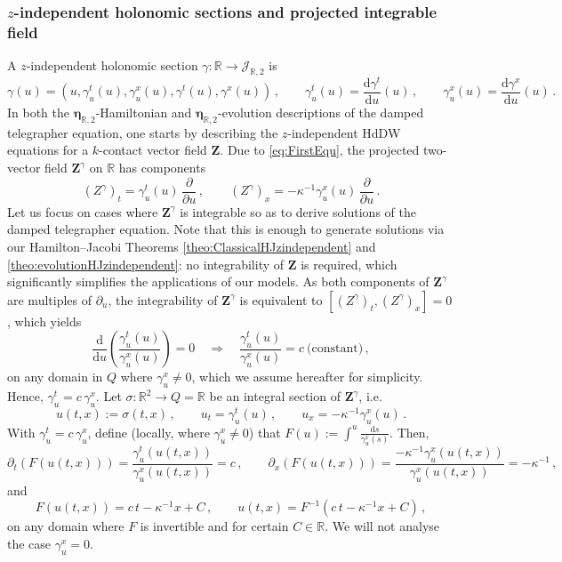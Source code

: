 \documentclass[11pt,twoside]{article}
\theoremstyle{plain}
\theoremstyle{definition}
\theoremstyle{remark}
\renewcommand{\d}{\mathrm{d}}
\begin{document}
\subsubsection{\texorpdfstring{$z$}{z}-independent holonomic sections and projected integrable field}


A $z$-independent holonomic section $\gamma\colon \mathbb{R}\rightarrow \mathcal{J}_{\mathbb{R},2}$ is
\[
\gamma(u)=(u,\gamma_u^t(u),\gamma_u^x(u),\gamma^t(u),\gamma^x(u))\,,
\qquad
\gamma_u^t(u)=\frac{\d\gamma^t}{\d u}(u)\,,\qquad \gamma_u^x(u)=\frac{\d\gamma^x}{\d u}(u)\,.
\]
In both the   ${\bm \eta}_{\mathbb{R},2}$-Hamiltonian and ${\bm \eta}_{\mathbb{R},2}$-evolution descriptions of the damped telegrapher equation, one starts by describing the $z$-independent HdDW equations for a $k$-contact vector field ${\bm Z}$. Due to \eqref{eq:FirstEqu},
the projected two-vector field ${\bm Z}^\gamma$ on $\mathbb{R}$ has components 
\[
(Z^\gamma)_t=\gamma_u^t(u)\,\frac{\partial}{\partial u}\,,
\qquad
(Z^\gamma)_x=-\kappa^{-1}\gamma_u^x(u)\,\frac{\partial}{\partial u}\,.
\]
Let us focus on cases where ${\bm Z}^\gamma$ is integrable so as to derive solutions of  the damped telegrapher equation. Note that this is enough to generate solutions via our Hamilton--Jacobi Theorems \ref{theo:ClassicalHJzindependent} and \ref{theo:evolutionHJzindependent}: no integrability of ${\bm Z}$ is required, which significantly simplifies the applications of our models. As both components of ${\bm Z}^\gamma$ are multiples of $\partial_u$,
the integrability of ${\bm Z}^\gamma$ is equivalent to $[(Z^\gamma)_t,(Z^\gamma)_x]=0$, which yields
\[
\frac{\d}{\d u}\left(\frac{\gamma_u^t(u)}{\gamma_u^x(u)}\right)=0
\quad\Longrightarrow\quad
\frac{\gamma_u^t(u)}{\gamma_u^x(u)}=c\ \text{(constant)}\,,
\]
on any domain in $Q$ where $\gamma_u^x\neq 0$, which we assume hereafter for simplicity. Hence, $\gamma_u^t=c\,\gamma_u^x$. Let $\sigma\colon\mathbb R^2\to Q=\mathbb R$ be an integral section of ${\bm Z}^\gamma$, i.e.
\[
    u(t,x):=\sigma(t,x)\,,\qquad
    u_t=\gamma_u^t(u)\,,\qquad u_x=-\kappa^{-1}\gamma_u^x(u)\,.
\]
With $\gamma_u^t=c\,\gamma_u^x$, define (locally, where $\gamma_u^x\neq0$) that 
\(F(u):=\int^u\frac{\d s}{\gamma_u^x(s)}\).
Then,
\[
\partial_t(F(u(t,x)))=\frac{\gamma_u^t(u(t,x))}{\gamma_u^x(u(t,x))}=c\,,\qquad 
\partial_x(F(u(t,x)))=\frac{-\kappa^{-1}\gamma_u^x(u(t,x))}{\gamma_u^x(u(t,x))}=-\kappa^{-1}\,,
\]
and 
\begin{equation}\label{eq:projected_solution_general}
    F(u(t,x))=c\,t-\kappa^{-1}x+C\,,
    \qquad
    u(t,x)=F^{-1}(c\,t-\kappa^{-1}x+C)\,,
\end{equation}
on any domain where $F$ is invertible and for certain $C\in \mathbb{R}$.  We will not analyse the case $\gamma_u^x=0$. 
\end{document}
